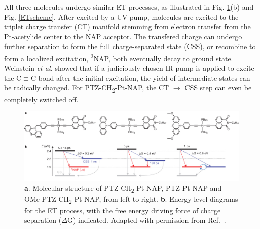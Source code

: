 All three molecules undergo similar ET processes, as illustrated in Fig. \ref{JuliaStruct}(b) and Fig. \ref{ETscheme}. After excited by a UV pump, molecules are excited to the triplet charge transfer (CT) manifold stemming from electron transfer from the Pt-acetylide center to the NAP acceptor. The transfered charge can undergo further separation to form the full charge-separated state (CSS), or recombine to form a localized excitation, \textsuperscript{3}NAP, both eventually decay to ground state. Weinstein {\em et al.} showed that if a judiciously chosen IR pump is applied to excite the C$\equiv$C bond after the initial excitation, the yield of intermediate states can be radically changed. For PTZ-CH\textsubscript{2}-Pt-NAP, the CT $\rightarrow$ CSS step can even be completely switched off.


\begin{figure}[!t]
\includegraphics[width=\columnwidth]{Chapters/chap4/Images/molecules.jpg}
\caption{\textbf{a}. Molecular structure of PTZ-CH\textsubscript{2}-Pt-NAP, PTZ-Pt-NAP and OMe-PTZ-CH\textsubscript{2}-Pt-NAP, from left to right. \textbf{b}. Energy level diagrams for the ET process, with the free energy driving force of charge separation ($\Delta$G) indicated. Adapted with permission from Ref.~\cite{delor2015mechanism}.\label{JuliaStruct}}
\end{figure}


